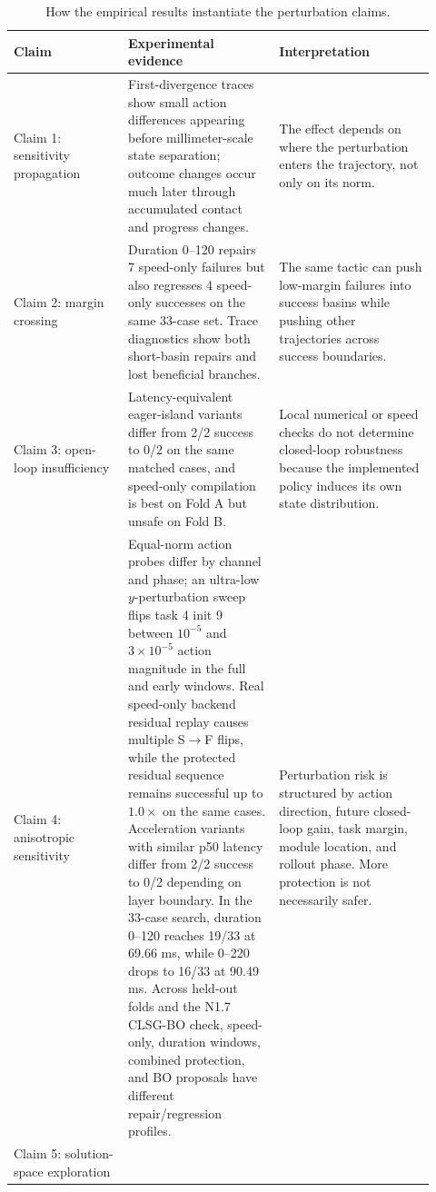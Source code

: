 \documentclass[10pt]{article}
\begin{document}
\begin{table}[H]
\centering
\small
\setlength{\tabcolsep}{4pt}
\caption{How the empirical results instantiate the perturbation claims.}
\label{tab:claim-evidence}
\begin{tabular}{p{0.25\linewidth}p{0.33\linewidth}p{0.34\linewidth}}
\toprule
Claim & Experimental evidence & Interpretation \\
\midrule
Claim 1: sensitivity propagation &
First-divergence traces show small action differences appearing before millimeter-scale state separation; outcome changes occur much later through accumulated contact and progress changes. &
The effect depends on where the perturbation enters the trajectory, not only on its norm. \\
\addlinespace
Claim 2: margin crossing &
Duration 0--120 repairs 7 speed-only failures but also regresses 4 speed-only successes on the same 33-case set. Trace diagnostics show both short-basin repairs and lost beneficial branches. &
The same tactic can push low-margin failures into success basins while pushing other trajectories across success boundaries. \\
\addlinespace
Claim 3: open-loop insufficiency &
Latency-equivalent eager-island variants differ from 2/2 success to 0/2 on the same matched cases, and speed-only compilation is best on Fold A but unsafe on Fold B. &
Local numerical or speed checks do not determine closed-loop robustness because the implemented policy induces its own state distribution. \\
\addlinespace
Claim 4: anisotropic sensitivity &
Equal-norm action probes differ by channel and phase; an ultra-low $y$-perturbation sweep flips task 4 init 9 between $10^{-5}$ and $3\times 10^{-5}$ action magnitude in the full and early windows. Real speed-only backend residual replay causes multiple S$\to$F flips, while the protected residual sequence remains successful up to $1.0\times$ on the same cases. Acceleration variants with similar p50 latency differ from 2/2 success to 0/2 depending on layer boundary. In the 33-case search, duration 0--120 reaches 19/33 at 69.66 ms, while 0--220 drops to 16/33 at 90.49 ms. Across held-out folds and the N1.7 CLSG-BO check, speed-only, duration windows, combined protection, and BO proposals have different repair/regression profiles. &
Perturbation risk is structured by action direction, future closed-loop gain, task margin, module location, and rollout phase. More protection is not necessarily safer. \\
\addlinespace
Claim 5: solution-space exploration &

\end{tabular}
\end{table}
\end{document}
